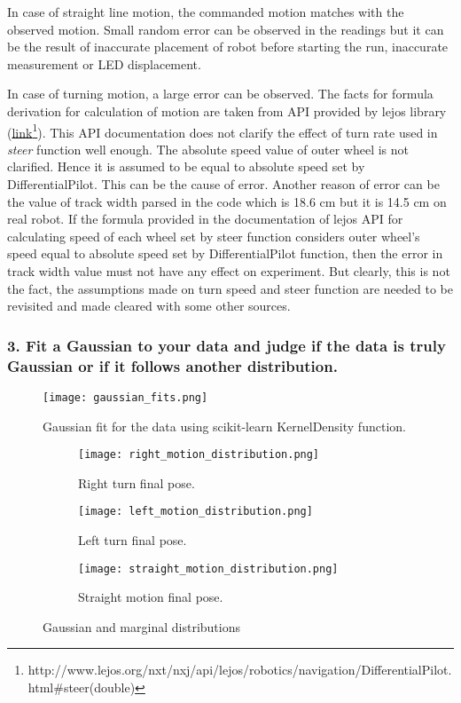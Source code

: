In case of straight line motion, the commanded motion matches with the observed motion. Small random error can be observed in the readings but it can be the result of inaccurate placement of robot before starting the run, inaccurate measurement or LED displacement. 

In case of turning motion, a large error can be observed. The facts for formula derivation for calculation of motion are taken from API provided by lejos library (\href{http://www.lejos.org/nxt/nxj/api/lejos/robotics/navigation/DifferentialPilot.html#steer(double)}{link}\footnote{http://www.lejos.org/nxt/nxj/api/lejos/robotics/navigation/DifferentialPilot.html$\#$steer(double)}). This API documentation does not clarify the effect of turn rate used in \textit{steer} function well enough. The absolute speed value of outer wheel is not clarified. Hence it is assumed to be equal to absolute speed set by DifferentialPilot. This can be the cause of error.
Another reason of error can be the value of track width parsed in the code which is 18.6 cm but it is 14.5 cm on real robot.
If the formula provided in the documentation of lejos API for calculating speed of each wheel set by steer function considers outer wheel's speed equal to absolute speed set by DifferentialPilot function, then the error in track width value must not have any effect on experiment. But clearly, this is not the fact, the assumptions made on turn speed and steer function are needed to be revisited and made cleared with some other sources.      

\newpage
\subsubsection*{3. Fit a Gaussian to your data and judge if the data is truly Gaussian or if it follows another distribution.}

\begin{figure}[ht]
\centering
\texttt{[image: gaussian\_fits.png]}
\caption{Gaussian fit for the data using scikit-learn KernelDensity function. }
\label{gaussian}
\end{figure}


\begin{figure}[H]
\centering
\begin{subfigure}[b]{0.3\textwidth}
\texttt{[image: right\_motion\_distribution.png]}
\caption{Right turn final pose.}
\label{distribution-right-turn}
\end{subfigure}
\qquad
\begin{subfigure}[b]{0.3\textwidth}
\texttt{[image: left\_motion\_distribution.png]}
\caption{Left turn final pose.}
\label{distribution-right-turn}
\end{subfigure}
\qquad
\begin{subfigure}[b]{0.3\textwidth}
\texttt{[image: straight\_motion\_distribution.png]}
\caption{Straight motion final pose.}
\label{distribution-straight-motion}
\end{subfigure}
\caption{Gaussian and marginal distributions }
\end{figure}

